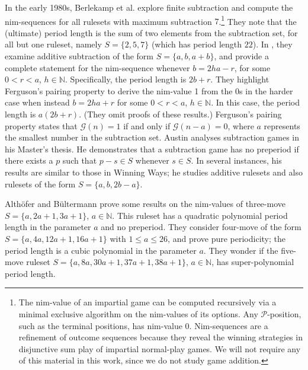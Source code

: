 \documentclass{amsart}
\theoremstyle{plain}
\theoremstyle{definition}
\renewcommand{\P}{\ensuremath{\mathcal P}}
\newcommand{\n}{\mathbb N}
\renewcommand{\le}{\leqslant}
\begin{document}
In the early 1980s, Berlekamp et al. \cite[vol. 1, chap. 4, p. 83]{berlekamp2004winning} explore {\sc finite subtraction} and compute the nim-sequences for all rulesets with maximum subtraction $7$.\footnote{The nim-value of an impartial game can be computed recursively via a minimal exclusive algorithm \cite{siegel2013combinatorial} on the nim-values of its options. Any \P-position, such as the terminal positions, has nim-value $0$. Nim-sequences are a refinement of outcome sequences because they reveal the winning strategies in disjunctive sum play of impartial normal-play games. We will not require any of this material in this work, since we do not study game addition.} They note that the (ultimate) period length is the sum of two elements from the subtraction set, for all but one ruleset, namely $S=\{2,5,7\}$ (which has period length  $22$). In  \cite[vol. 3, chap. 5, p. 529]{berlekamp2004winning}, they examine {\sc additive subtraction} of the form $S = \{a, b, a+b\}$, and provide a complete statement for the nim-sequence whenever $b=2ha-r$, for some $0<r<a$, $h\in\n$. Specifically, the period length is $2b+r$. They highlight Ferguson's pairing property to derive the nim-value 1 from the 0s in the harder case when instead $b=2ha+r$ for some $0<r<a$, $h\in\n$. In this case, the period length is $a(2b+r)$. (They omit proofs of these results.) Ferguson's pairing property states that $\mathcal{G}(n)=1$ if and only if $\mathcal{G}(n-a)=0$, where $a$ represents the smallest number in the subtraction set.  
Austin \cite{austin1976impartial} analyses subtraction games in his Master's thesis. He demonstrates that a subtraction game has no preperiod if there exists a $p$ such that $p-s\in S$ whenever $s\in S$. In several instances, his results are similar to those in Winning Ways; he studies additive rulesets and also rulesets of the form $S=\{a,b, 2b-a\}$. 

Alth{\"o}fer  and B{\"u}ltermann  \cite{althofer1995superlinear} prove some results on the nim-values of {\sc three-move}  $S= \{a,2a+1, 3a+1\}$, $a \in \n$. This ruleset has a quadratic polynomial period length in the parameter $a$ and no preperiod.  They consider {\sc four-move} of the form $S=\{a,4a,12a+1,16a+1\}$ with $1\le a \le 26$, and prove pure periodicity; the period length is a cubic polynomial in the parameter $a$. They wonder if the {\sc five-move} ruleset   
$S=\{a,8a,30a+1,37a+1,38a+1\}$, $a \in \n$, has super-polynomial period length. 
\end{document}
